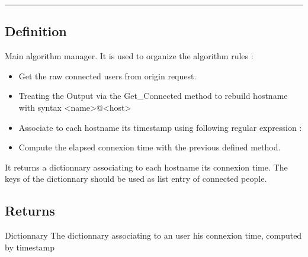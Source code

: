 \documentclass[letterpaper,10pt,english]{sphinxmanual}
\begin{document}
\bigskip\hrule\bigskip



\subsection{Definition}
\label{\detokenize{OA/Get_Connexion_Time:definition}}
\sphinxAtStartPar
Main algorithm manager.
It is used to organize the algorithm rules :
\begin{itemize}
\item {} 
\sphinxAtStartPar
Get the raw connected users from origin request.

\item {} 
\sphinxAtStartPar
Treating the Output via the Get\_Connected method to rebuild hostname with syntax \textless{}name\textgreater{}@\textless{}host\textgreater{}

\item {} 
\sphinxAtStartPar
Associate to each hostname its timestamp using following regular expression : \sphinxstylestrong{{[}0\sphinxhyphen{}9{]}+:{[}0\sphinxhyphen{}9{]}+}

\item {} 
\sphinxAtStartPar
Compute the elapsed connexion time with the previous defined  method.

\end{itemize}

\sphinxAtStartPar
It returns a dictionnary associating to each hostname its connexion time. The keys of the dictionnary should be used as list entry of connected people.


\subsection{Returns}
\label{\detokenize{OA/Get_Connexion_Time:returns}}
\sphinxAtStartPar
Dictionnary
The dictionnary associating to an user his connexion time, computed by timestamp
\end{document}
